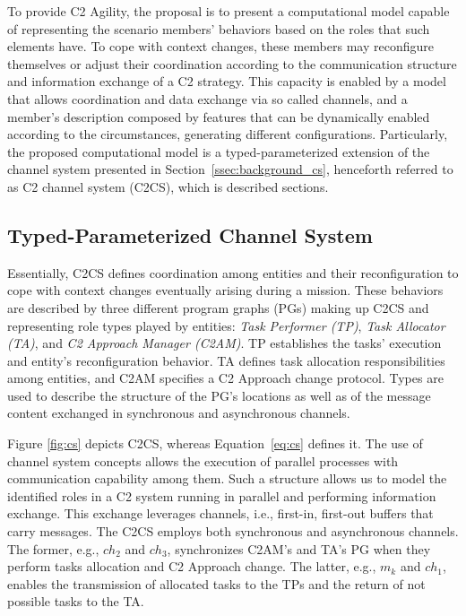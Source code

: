 To provide C2 Agility, the proposal is to present a computational model capable of representing the scenario members’ behaviors based on the roles that such elements have. To cope with context changes, these members may reconfigure themselves or adjust their coordination according to the communication structure and information exchange of a C2 strategy. This capacity is enabled by a model that allows coordination and data exchange via so called channels, and a member’s description composed by features that can be dynamically enabled according to the circumstances, generating different configurations. Particularly, the proposed computational model is a typed-parameterized extension of the channel system presented in Section~\ref{ssec:background_cs}, henceforth referred to as C2 channel system (C2CS), which is described  sections.



\subsection{Typed-Parameterized Channel System}
\label{sec:channelSystem}

Essentially, C2CS defines coordination among entities and their reconfiguration to cope with context changes eventually arising during a mission. These behaviors are described by three different program graphs (PGs) making up C2CS and representing role types played by entities: \textit{Task Performer (TP)}, \textit{Task Allocator (TA)}, and \textit{C2 Approach Manager (C2AM)}. TP establishes the tasks' execution and entity's reconfiguration behavior. TA defines task allocation responsibilities among entities, and C2AM specifies a C2 Approach change protocol. Types are used to describe the structure of the PG's locations as well as of the message content exchanged in synchronous and asynchronous channels. 

Figure \ref{fig:cs} depicts C2CS, whereas Equation~\ref{eq:cs} defines it. The use of channel system concepts allows the execution of parallel processes with communication capability among them. Such a structure allows us to model the identified roles in a C2 system running in parallel and performing information exchange. This exchange leverages channels, i.e., first-in, first-out buffers that carry messages. The C2CS employs both synchronous and asynchronous channels. The former, e.g., $ch_2$ and $ch_3$, synchronizes C2AM's and TA's PG when they perform tasks allocation and C2 Approach change. The latter, e.g., $m_k$ and $ch_1$, enables the transmission of allocated tasks to the TPs and the return of not possible tasks to the TA. 

